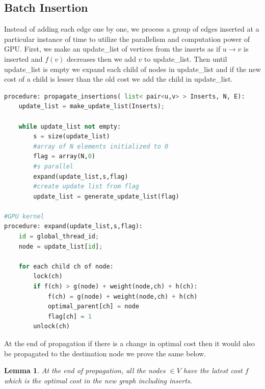 \documentclass[a4paper]{article}
\newtheorem{lemma}[theorem]{Lemma}
\begin{document}
\subsection{Batch Insertion}\label{subsec:batch_ins}
Instead of adding each edge one by one, we process a group of edges inserted at a particular instance of time to utilize the parallelism and computation power of GPU. First, we make an update\_list of vertices from the inserts as if $u \rightarrow v $ is inserted and $f(v)$ decreases then we add $v$ to update\_list. Then until update\_list is empty we expand each child of nodes in update\_list and if the new cost of a child is lesser than the old cost we add the child in update\_list.
\begin{lstlisting}[language=python, caption=Propagation of Insertions,label=algo:prop_ins]
procedure: propagate_insertions( list< pair<u,v> > Inserts, N, E):
    update_list = make_update_list(Inserts);
                          
    while update_list not empty:
        s = size(update_list)
        #array of N elements initialized to 0
        flag = array(N,0)
        #s parallel
        expand(update_list,s,flag)
        #create update list from flag
        update_list = generate_update_list(flag)
        
#GPU kernel
procedure: expand(update_list,s,flag):
    id = global_thread_id;
    node = update_list[id];
    
    for each child ch of node:
        lock(ch)
        if f(ch) > g(node) + weight(node,ch) + h(ch):
            f(ch) = g(node) + weight(node,ch) + h(ch)  
            optimal_parent[ch] = node
            flag[ch] = 1
        unlock(ch)


\end{lstlisting}
At the end of propagation if there is a change in optimal cost then it would also be propagated to the destination node we prove the same below.
\begin{lemma}\label{lemma:insertion_property3}
At the end of propagation, all the nodes $\in V$ have the latest cost  $f$ which is the optimal cost in the new graph including inserts.
\end{lemma}
\end{document}
